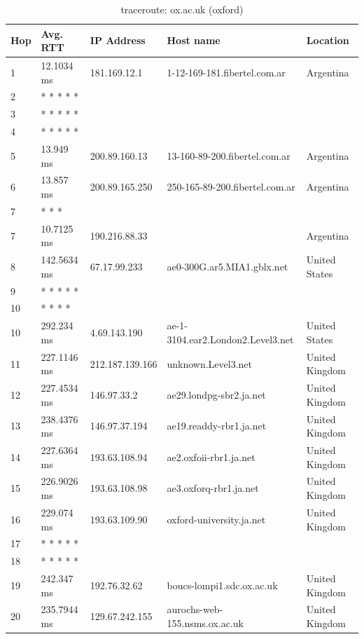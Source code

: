\begin{table}[H]
\caption{traceroute: ox.ac.uk (oxford)}
\centering
\begin{tabular}{@{}l|llll@{}}
\toprule
Hop & Avg. RTT & IP Address & Host name & Location\\ \midrule
1 & 12.1034 ms & 181.169.12.1 & 1-12-169-181.fibertel.com.ar & Argentina\\
2 &  * * * * * &  &  &  \\
3 &  * * * * * &  &  &  \\
4 &  * * * * * &  &  &  \\
5 & 13.949 ms & 200.89.160.13 & 13-160-89-200.fibertel.com.ar & Argentina\\
6 & 13.857 ms & 200.89.165.250 & 250-165-89-200.fibertel.com.ar & Argentina\\
7 &  * * * &  &  &  \\
7 & 10.7125 ms & 190.216.88.33 &  & Argentina\\
8 & 142.5634 ms & 67.17.99.233 & ae0-300G.ar5.MIA1.gblx.net & United States\\
9 &  * * * * * &  &  &  \\
10 &  * * * * &  &  &  \\
10 & 292.234 ms & 4.69.143.190 & ae-1-3104.ear2.London2.Level3.net & United States\\
11 & 227.1146 ms & 212.187.139.166 & unknown.Level3.net & United Kingdom\\
12 & 227.4534 ms & 146.97.33.2 & ae29.londpg-sbr2.ja.net & United Kingdom\\
13 & 238.4376 ms & 146.97.37.194 & ae19.readdy-rbr1.ja.net & United Kingdom\\
14 & 227.6364 ms & 193.63.108.94 & ae2.oxfoii-rbr1.ja.net & United Kingdom\\
15 & 226.9026 ms & 193.63.108.98 & ae3.oxforq-rbr1.ja.net & United Kingdom\\
16 & 229.074 ms & 193.63.109.90 & oxford-university.ja.net & United Kingdom\\
17 &  * * * * * &  &  &  \\
18 &  * * * * * &  &  &  \\
19 & 242.347 ms & 192.76.32.62 & boucs-lompi1.sdc.ox.ac.uk & United Kingdom\\
20 & 235.7944 ms & 129.67.242.155 & aurochs-web-155.nsms.ox.ac.uk & United Kingdom\\

\end{tabular}
\label{oxford}
\end{table}

